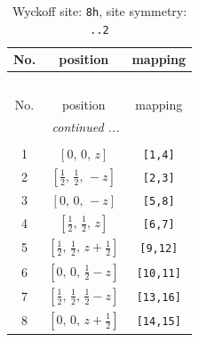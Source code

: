 \documentclass[fleqn,8pt]{jsarticle}
\begin{document}
\begin{longtable}{ccc}
\caption{Wyckoff site: {\tt 8h}, site symmetry: {\tt ..2}}
 \\
 \hline \hline
No. & position & mapping \\ \hline \endfirsthead

\multicolumn{2}{l}{\tablename\ \thetable{}} \\
 \hline \hline
No. & position & mapping \\ \hline \endhead

 \hline \hline
\multicolumn{2}{r}{\footnotesize\it continued ...} \\ \endfoot

 \hline \hline
\multicolumn{2}{r}{} \\ \endlastfoot

1 & $\left[ 0,\, 0,\, z \right]$ & {\tt [1,4]} \\ \hline
2 & $\left[ \frac{1}{2},\, \frac{1}{2},\, - z \right]$ & {\tt [2,3]} \\ \hline
3 & $\left[ 0,\, 0,\, - z \right]$ & {\tt [5,8]} \\ \hline
4 & $\left[ \frac{1}{2},\, \frac{1}{2},\, z \right]$ & {\tt [6,7]} \\ \hline
5 & $\left[ \frac{1}{2},\, \frac{1}{2},\, z + \frac{1}{2} \right]$ & {\tt [9,12]} \\ \hline
6 & $\left[ 0,\, 0,\, \frac{1}{2} - z \right]$ & {\tt [10,11]} \\ \hline
7 & $\left[ \frac{1}{2},\, \frac{1}{2},\, \frac{1}{2} - z \right]$ & {\tt [13,16]} \\ \hline
8 & $\left[ 0,\, 0,\, z + \frac{1}{2} \right]$ & {\tt [14,15]} \\
\end{longtable}
\renewcommand{\arraystretch}{1.2}
\end{document}
